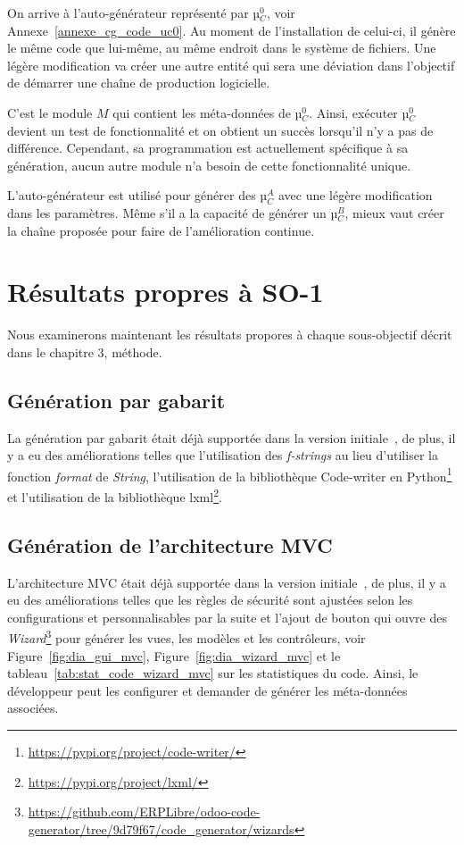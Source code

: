 On arrive à l'auto-générateur représenté par µ$_C^0$, voir Annexe~\ref{annexe_cg_code_uc0}. Au moment de l'installation de celui-ci, il génère le même code que lui-même, au même endroit dans le système de fichiers. Une légère modification va créer une autre entité qui sera une déviation dans l’objectif de démarrer une chaîne de production logicielle.

C'est le module $M$ qui contient les méta-données de µ$_C^0$. Ainsi, exécuter µ$_C^0$ devient un test de fonctionnalité et on obtient un succès lorsqu'il n'y a pas de différence. Cependant, sa programmation est actuellement spécifique à sa génération, aucun autre module n’a besoin de cette fonctionnalité unique.

L'auto-générateur est utilisé pour générer des µ$_C^A$ avec une légère modification dans les paramètres. Même s'il a la capacité de générer un µ$_C^B$, mieux vaut créer la chaîne proposée pour faire de l'amélioration continue.

\section{Résultats propres à SO-1}
Nous examinerons maintenant les résultats propores à chaque sous-objectif décrit dans le chapitre 3, méthode.
\subsection{Génération par gabarit}

La génération par gabarit était déjà supportée dans la version initiale~\cite{bluiksnot_repo}, de plus, il y a eu des améliorations telles que l'utilisation des \textit{f-strings} au lieu d'utiliser la fonction \textit{format} de \textit{String}, l'utilisation de la bibliothèque Code-writer en Python\footnote{\url{https://pypi.org/project/code-writer/}} et l'utilisation de la bibliothèque lxml\footnote{\url{https://pypi.org/project/lxml/}}.

\subsection{Génération de l'architecture MVC}

L’architecture MVC était déjà supportée dans la version initiale~\cite{bluiksnot_repo}, de plus, il y a eu des améliorations telles que les règles de sécurité sont ajustées selon les configurations et personnalisables par la suite et l'ajout de bouton qui ouvre des \textit{Wizard}\footnote{\url{https://github.com/ERPLibre/odoo-code-generator/tree/9d79f67/code_generator/wizards}} pour générer les vues, les modèles et les contrôleurs, voir Figure~\ref{fig:dia_gui_mvc}, Figure~\ref{fig:dia_wizard_mvc} et le tableau~\ref{tab:stat_code_wizard_mvc} sur les statistiques du code. Ainsi, le développeur peut les configurer et demander de générer les méta-données associées.

